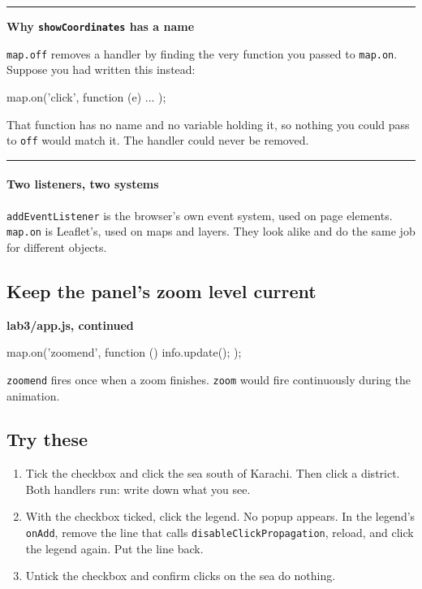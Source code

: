 \documentclass{article}
\newcommand{\cd}[1]{\texttt{#1}}
\newcommand{\codecap}[1]{%
  \par\vspace{.9em}\noindent\textbf{#1}\par\vspace{-.6em}}
\newenvironment{keypoint}[1]
  {\par\vspace{.7em}\noindent\rule{\linewidth}{.6pt}\par\vspace{.15em}
   \noindent\textbf{#1}\par\nobreak\vspace{-.3em}}
  {\par\vspace{.15em}\noindent\rule{\linewidth}{.6pt}\par\vspace{.7em}}
\begin{document}
\begin{keypoint}{Why \texttt{showCoordinates} has a name}
\cd{map.off} removes a handler by finding the very function you passed
to \cd{map.on}. Suppose you had written this instead:

\begin{code}
map.on('click', function (e) { ... });
\end{code}

That function has no name and no variable holding it, so nothing you
could pass to \cd{off} would match it. The handler could never be
removed.
\end{keypoint}

\paragraph{Two listeners, two systems}
\cd{addEventListener} is the browser's own event system, used on page
elements. \cd{map.on} is Leaflet's, used on maps and layers. They look
alike and do the same job for different objects.

\subsection{Keep the panel's zoom level current}

\codecap{lab3/app.js, continued}
\begin{code}
map.on('zoomend', function () {
  info.update();
});
\end{code}

\cd{zoomend} fires once when a zoom finishes. \cd{zoom} would fire
continuously during the animation.

\subsection{Try these}

\begin{enumerate}
  \item Tick the checkbox and click the sea south of Karachi. Then click
        a district. Both handlers run: write down what you see.
  \item With the checkbox ticked, click the legend. No popup appears.
        In the legend's \cd{onAdd}, remove the line that calls
        \cd{disableClickPropagation}, reload, and click the legend again.
        Put the line back.
  \item Untick the checkbox and confirm clicks on the sea do nothing.
\end{enumerate}
\end{document}
